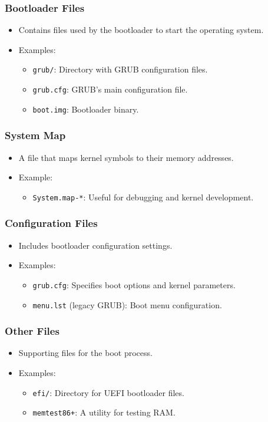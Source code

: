 \subsubsection*{Bootloader Files}
\begin{itemize}
    \item Contains files used by the bootloader to start the operating system.
    \item Examples:
    \begin{itemize}
        \item \texttt{grub/}: Directory with GRUB configuration files.
        \item \texttt{grub.cfg}: GRUB's main configuration file.
        \item \texttt{boot.img}: Bootloader binary.
    \end{itemize}
\end{itemize}

\subsubsection*{System Map}
\begin{itemize}
    \item A file that maps kernel symbols to their memory addresses.
    \item Example:
    \begin{itemize}
        \item \texttt{System.map-*}: Useful for debugging and kernel development.
    \end{itemize}
\end{itemize}

\subsubsection*{Configuration Files}
\begin{itemize}
    \item Includes bootloader configuration settings.
    \item Examples:
    \begin{itemize}
        \item \texttt{grub.cfg}: Specifies boot options and kernel parameters.
        \item \texttt{menu.lst} (legacy GRUB): Boot menu configuration.
    \end{itemize}
\end{itemize}

\subsubsection*{Other Files}
\begin{itemize}
    \item Supporting files for the boot process.
    \item Examples:
    \begin{itemize}
        \item \texttt{efi/}: Directory for UEFI bootloader files.
        \item \texttt{memtest86+}: A utility for testing RAM\@.
    \end{itemize}
\end{itemize}

